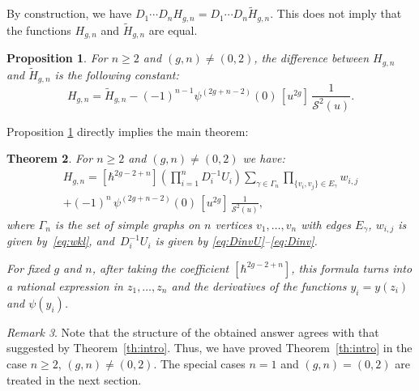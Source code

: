 \documentclass[11pt]{article}
\let\mathcal\mathscr
\theoremstyle{plain}
\newtheorem{theorem}{Theorem}[section]
\newtheorem{proposition}[theorem]{Proposition}
\theoremstyle{definition}
\theoremstyle{remark}
\newtheorem{remark}[theorem]{Remark}
\newcommand{\cS}{\mathcal{S}}
\newcommand{\Hc}{H}
\begin{document}
By construction, we have $D_1\cdots D_n H_{g,n}=D_1\cdots D_n \widetilde H_{g,n}$. This does not imply that the functions $H_{g,n}$ and $\widetilde H_{g,n}$ are equal.

\begin{proposition}\label{prop:tHconst}
For $n\geq 2$ and $(g,n)\ne(0,2)$, the difference between $H_{g,n}$ and $\widetilde{H}_{g,n}$ is the following constant:
\begin{equation}\label{eq:tHconst}
H_{g,n} = \widetilde{H}_{g,n} - (-1)^{n-1}
\psi^{(2g+n-2)}(0)\,[u^{2g}]\,\frac1{\cS^2(u)}.
\end{equation}
\end{proposition}

Proposition \ref{prop:tHconst} directly implies the main theorem:
\begin{theorem}\label{th:MainTh}
For $n\geq 2$ and $(g,n)\ne(0,2)$ we have:
\begin{multline}\label{eq:mainth}
\Hc_{g,n}= [\hbar^{2g-2+n}] \left(\textstyle\prod_{i=1}^n D_i^{-1}U_i\right) \sum\limits_{\gamma\in\Gamma_n}\prod\limits_{\{v_i,v_j\}\in E_\gamma} w_{i,j}\\
+ (-1)^{n}\,\psi^{(2g+n-2)}(0)\,[u^{2g}]\,\frac1{\cS^2(u)},
\end{multline}
where $\Gamma_n$ is the set of simple graphs on $n$ vertices $v_1,\ldots,v_n$ with edges $E_\gamma$, $w_{i,j}$ is given by~\eqref{eq:wkl}, and~$D_i^{-1}U_i$ is given by \eqref{eq:DinvU}--\eqref{eq:Dinv}.

For fixed $g$ and $n$, after taking the coefficient $[\hbar^{2g-2+n}]$,
this formula turns into a rational expression in $z_1,\ldots,z_n$ and the derivatives of the functions $y_i=y(z_i)$ and $\psi(y_i)$.
\end{theorem}
\begin{remark}
Note that the structure of the obtained answer agrees with that suggested by Theorem~\ref{th:intro}. Thus, we have proved Theorem~\ref{th:intro} in the case $n\ge2$, $(g,n)\ne(0,2)$.
The special cases $n=1$ and $(g,n)=(0,2)$ are treated in the next section.
\end{remark}
\end{document}
